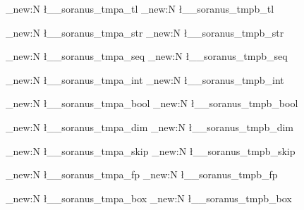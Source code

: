 %
%
%
% 
%



%

\tl_new:N \l__soranus_tmpa_tl
\tl_new:N \l__soranus_tmpb_tl

\str_new:N \l__soranus_tmpa_str
\str_new:N \l__soranus_tmpb_str

\seq_new:N \l__soranus_tmpa_seq
\seq_new:N \l__soranus_tmpb_seq

\int_new:N \l__soranus_tmpa_int
\int_new:N \l__soranus_tmpb_int

\bool_new:N \l__soranus_tmpa_bool
\bool_new:N \l__soranus_tmpb_bool

\dim_new:N \l__soranus_tmpa_dim
\dim_new:N \l__soranus_tmpb_dim

\skip_new:N \l__soranus_tmpa_skip
\skip_new:N \l__soranus_tmpb_skip

\fp_new:N \l__soranus_tmpa_fp
\fp_new:N \l__soranus_tmpb_fp

\box_new:N \l__soranus_tmpa_box
\box_new:N \l__soranus_tmpb_box
